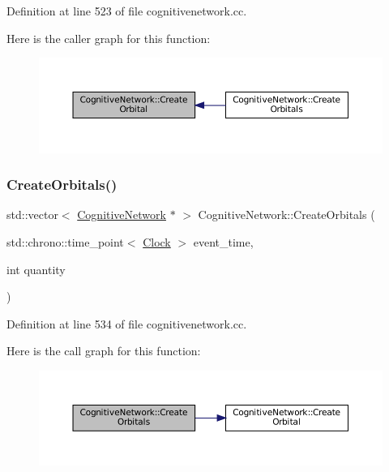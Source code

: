 Definition at line 523 of file cognitivenetwork.\+cc.

Here is the caller graph for this function\+:\nopagebreak
\begin{figure}[H]
\begin{center}
\leavevmode
\includegraphics[width=350pt]{class_cognitive_network_a5e0a782afc45d75d57fef91dd5513546_icgraph}
\end{center}
\end{figure}
\mbox{\label{class_cognitive_network_a46d4189cf3e6b9af6190abe7b79539b4}} 
\subsubsection{\texorpdfstring{Create\+Orbitals()}{CreateOrbitals()}}
{\footnotesize\ttfamily std\+::vector$<$ \mbox{\hyperlink{class_cognitive_network}{Cognitive\+Network}} $\ast$ $>$ Cognitive\+Network\+::\+Create\+Orbitals (\begin{DoxyParamCaption}\item[{std\+::chrono\+::time\+\_\+point$<$ \mbox{\hyperlink{universe_8h_a0ef8d951d1ca5ab3cfaf7ab4c7a6fd80}{Clock}} $>$}]{event\+\_\+time,  }\item[{int}]{quantity }\end{DoxyParamCaption})}



Definition at line 534 of file cognitivenetwork.\+cc.

Here is the call graph for this function\+:\nopagebreak
\begin{figure}[H]
\begin{center}
\leavevmode
\includegraphics[width=350pt]{class_cognitive_network_a46d4189cf3e6b9af6190abe7b79539b4_cgraph}
\end{center}
\end{figure}
\mbox{\label{class_cognitive_network_ade8e9295b35790b136dca9084a1b7aa9}} 
